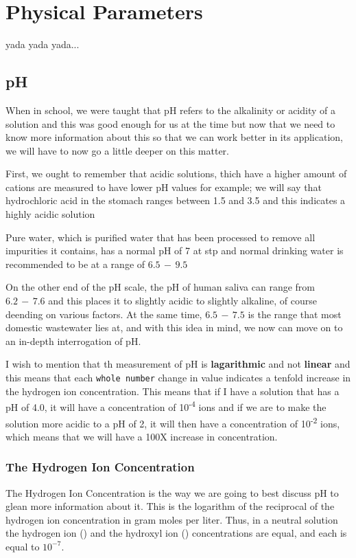 \chapter{Physical Parameters}
yada yada yada...

\section{pH}
When in school, we were taught that pH refers to the alkalinity or acidity of a solution\cite{IUPAC+S05746+2025} and this was good enough for us at the time but now that we need to know more information about this so that we can work better in its application, we will have to now go a little deeper on this matter.

First, we ought to remember that acidic solutions, thich have a higher amount of  cations are measured to have lower pH values for example; we will say that hydrochloric acid in the stomach ranges between 1.5 and 3.5 and this indicates a highly acidic solution

Pure water, which is purified water that has been processed to remove all impurities it contains, has a normal pH of 7 at \gls{stp} and normal drinking water is recommended to be at a range of \(6.5\,-\,9.5\)

On the other end of the pH scale, the pH of human saliva can range from \(6.2\,-\,7.6\) and this places it to slightly acidic to slightly alkaline, of course deending on various factors. At the same time, \(6.5\,-\,7.5\) is the range that most domestic wastewater lies at, and with this idea in mind, we now can move on to an in-depth interrogation of pH.

I wish to mention that th measurement of pH is \textbf{lagarithmic} and not \textbf{linear} and this means that each \texttt{whole number} change in value indicates a tenfold increase in the hydrogen ion concentration. This means that if I have a solution that has a pH of 4.0, it will have a concentration of 10\textsuperscript{-4} ions and if we are to make the solution more acidic to a pH of 2, it will then have a concentration of 10\textsuperscript{-2} ions, which means that we will have a 100X increase in concentration.

\subsection{The Hydrogen Ion Concentration}
The Hydrogen Ion Concentration is the way we are going to best discuss pH to glean more information about it. This is the logarithm of the reciprocal of the hydrogen ion concentration in gram moles per liter. Thus, in a neutral solution the hydrogen ion () and the hydroxyl ion () concentrations are equal, and each is equal to $10^{-7}$.

